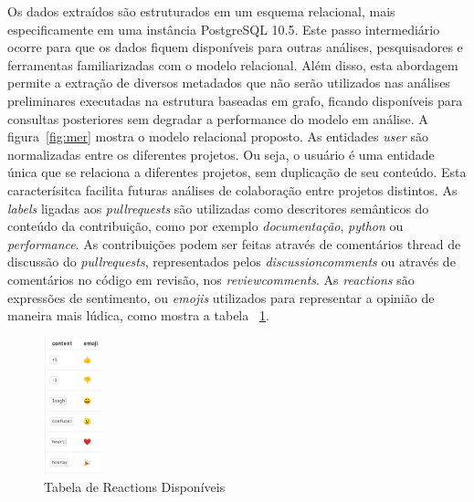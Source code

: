 \documentclass[sigconf]{acmart}
\begin{document}
Os dados extraídos são estruturados em um esquema relacional, mais especificamente em uma instância PostgreSQL 10.5. Este passo intermediário ocorre para que os dados fiquem disponíveis para outras análises, pesquisadores e ferramentas familiarizadas com o modelo relacional. Além disso, esta abordagem permite a extração de diversos metadados que não serão utilizados nas análises preliminares executadas na estrutura baseadas em grafo, ficando disponíveis para consultas posteriores sem degradar a performance do modelo em análise. A figura~\ref{fig:mer} mostra o modelo relacional proposto. As entidades \textit{user} são normalizadas entre os diferentes projetos. Ou seja, o usuário é uma entidade única que se relaciona a diferentes projetos, sem duplicação de seu conteúdo. Esta caracterísitca facilita futuras análises de colaboração entre projetos distintos. As \textit{labels} ligadas aos \textit{pullrequests} são utilizadas como descritores semânticos do conteúdo da contribuição, como por exemplo \textit{documentação}, \textit{python} ou \textit{performance}. As contribuições podem ser feitas através de comentários thread de discussão do \textit{pullrequests}, representados pelos \textit{discussioncomments} ou através de comentários no código em revisão, nos \textit{reviewcomments}. As \textit{reactions} são expressões de sentimento, ou \textit{emojis} utilizados para representar a opinião de maneira mais lúdica, como mostra a tabela ~\ref{fig:reactions}.

\begin{figure}[!htbp]
 \centering
 \includegraphics[height=150]{reactions}
 \caption{Tabela de Reactions Disponíveis}\label{fig:reactions}
\end{figure}
\end{document}
